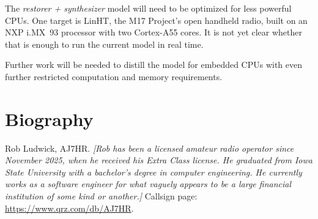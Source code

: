 \documentclass[10pt,twocolumn,a4paper]{article}
\begin{document}
The \emph{restorer + synthesizer} model will need to be optimized for
less powerful CPUs. One target is LinHT, the M17 Project's open
handheld radio, built on an NXP i.MX~93 processor with two Cortex-A55
cores. It is not yet clear whether that is enough to run the current
model in real time.

Further work will be needed to distill the model for embedded CPUs with
even further restricted computation and memory requirements.

\section*{Biography}

Rob Ludwick, AJ7HR. \emph{[Rob has been a licensed amateur radio operator since November 2025,
when he received his Extra Class license.  He graduated from Iowa State University with 
a bachelor's degree in computer engineering. He currently works as a software engineer for what
vaguely appears to be a large financial institution of some kind or another.]}
Callsign page: \url{https://www.qrz.com/db/AJ7HR}.



\end{document}
